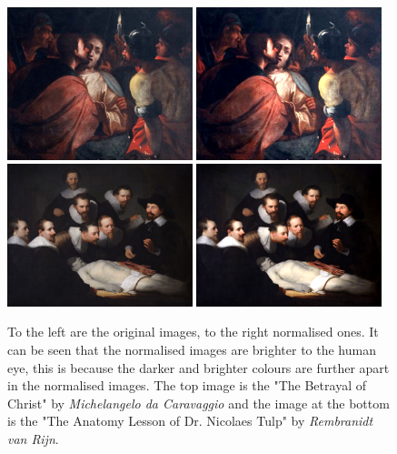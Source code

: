 \documentclass[11pt,a4paper,twoside,openright]{report}
\begin{document}
\begin{figure}[tbp]
\centering
\includegraphics[width=0.48\textwidth]{nirp_caravaggio_1962_139_1}
\includegraphics[width=0.48\textwidth]{caravaggio_1962_139_1}
\includegraphics[width=0.48\textwidth]{nirp_rembrandt_eu_464}
\includegraphics[width=0.48\textwidth]{rembrandt_eu_464}
\caption[Colour normalisation]{To the left are the original images, to the
right normalised ones.  It can be seen that the normalised images are brighter
to the human eye, this is because the darker and brighter colours are further
apart in the normalised images.  The top image is the "The Betrayal of Christ"
by \emph{Michelangelo da Caravaggio} and the image at the bottom is the "The
Anatomy Lesson of Dr. Nicolaes Tulp" by \emph{Rembranidt van Rijn}.}
\label{fig:norm}
\end{figure}
\end{document}
